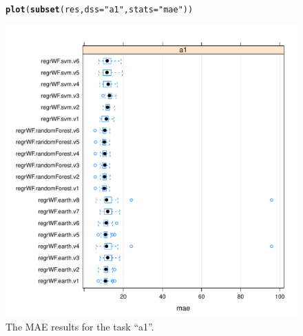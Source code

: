 \documentclass[10pt,a4paper]{article}\usepackage[]{graphicx}\usepackage[]{color}
\makeatletter
\def\maxwidth{ %
  \ifdim\Gin@nat@width>\linewidth
    \linewidth
  \else
    \Gin@nat@width
  \fi
}
\newcommand{\hlstr}[1]{\textcolor[rgb]{0.192,0.494,0.8}{#1}}%
\newcommand{\hlstd}[1]{\textcolor[rgb]{0.345,0.345,0.345}{#1}}%
\newcommand{\hlkwc}[1]{\textcolor[rgb]{0.333,0.667,0.333}{#1}}%
\newcommand{\hlkwd}[1]{\textcolor[rgb]{0.737,0.353,0.396}{\textbf{#1}}}%
\newenvironment{kframe}{%
 \def\at@end@of@kframe{}%
 \ifinner\ifhmode%
  \def\at@end@of@kframe{\end{minipage}}%
  \begin{minipage}{\columnwidth}%
 \fi\fi%
 \def\FrameCommand##1{\hskip\@totalleftmargin \hskip-\fboxsep
 \colorbox{shadecolor}{##1}\hskip-\fboxsep
     \hskip-\linewidth \hskip-\@totalleftmargin \hskip\columnwidth}%
 \MakeFramed {\advance\hsize-\width
   \@totalleftmargin\z@ \linewidth\hsize
   \@setminipage}}%
 {\par\unskip\endMakeFramed%
 \at@end@of@kframe}
\newenvironment{knitrout}{}{} %
\makeatother
\begin{document}
\begin{figure}[ht]
  \centering
\begin{knitrout}
\color{fgcolor}\begin{kframe}
\begin{alltt}
\hlkwd{plot}\hlstd{(}\hlkwd{subset}\hlstd{(res,} \hlkwc{dss} \hlstd{=} \hlstr{"a1"}\hlstd{,} \hlkwc{stats} \hlstd{=} \hlstr{"mae"}\hlstd{))}
\end{alltt}
\end{kframe}

{\centering \includegraphics[width=\maxwidth]{figure/minimal-unnamed-chunk-30} 

}



\end{knitrout}

  \caption{The MAE results for the task ``a1''.}
  \label{fig:maeA1}
\end{figure}
\end{document}
